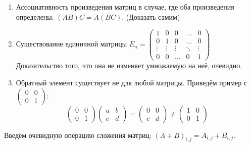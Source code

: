\begin{properties}\leavevmode
    \begin{enumerate}
        \item
            Ассоциативность произведения матриц в случае, где оба произведения определены:
            $(AB)C = A(BC)$. (Доказать самим)
        \item
            Существование единичной матрицы $E_n = 
            \begin{pmatrix}
                1 & 0 & 0 & \dots & 0\\
                0 & 1 & 0 & \dots & 0\\
                \vdots & \vdots & \vdots & \ddots & \vdots\\
                0 & 0 & \dots & 0 & 1
            \end{pmatrix}$
            Доказательство того, что она не изменяет умножаемую на неё, очевидно.
        \item Обратный элемент существует не для любой матрицы. Приведём пример с 
            $
            \begin{pmatrix}
                0 & 0\\
                0 & 1
            \end{pmatrix}$: $$
            \begin{pmatrix}
                0 & 0\\
                0 & 1
            \end{pmatrix}
            \begin{pmatrix}
                a & b\\
                c & d
            \end{pmatrix} = 
            \begin{pmatrix}
                0 & 0\\
                c & d
            \end{pmatrix}\not=
            \begin{pmatrix}
                1 & 0\\
                0 & 1
            \end{pmatrix} $$
    \end{enumerate}
\end{properties}
 Введём очевидную операцию сложения матриц: $(A+B)_{i,j} = A_{i,j} + B_{i,j}$.

